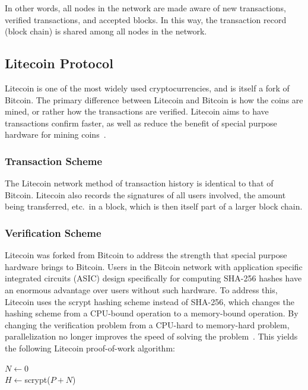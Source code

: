\documentclass[11pt]{article}
\begin{document}
In other words, all nodes in the network are made aware of new transactions,
verified transactions, and accepted blocks. In this way, the transaction record
(block chain) is shared among all nodes in the network.

\subsection{Litecoin Protocol}
Litecoin is one of the most widely used cryptocurrencies, and is itself a fork
of Bitcoin. The primary difference between Litecoin and Bitcoin is how the coins
are mined, or rather how the transactions are verified. Litecoin aims to have
transactions confirm faster, as well as reduce the benefit of special purpose
hardware for mining coins~\cite{survey}.

\subsubsection{Transaction Scheme}
The Litecoin network method of transaction history is identical to that of
Bitcoin. Litecoin also records the signatures of all users involved, the amount
being transferred, etc.\ in a block, which is then itself part of a larger block
chain.

\subsubsection{Verification Scheme}
Litecoin was forked from Bitcoin to address the strength that special purpose
hardware brings to Bitcoin. Users in the Bitcoin network with application
specific integrated circuits (ASIC) design specifically for computing SHA-256
hashes have an enormous advantage over users without such hardware. To address
this, Litecoin uses the scrypt hashing scheme instead of SHA-256, which changes
the hashing scheme from a CPU-bound operation to a memory-bound operation. By
changing the verification problem from a CPU-hard to memory-hard problem,
parallelization no longer improves the speed of solving the
problem~\cite{Percival}. This yields the following Litecoin proof-of-work
algorithm:
\begin{algorithm}
    $N \gets 0$\\
    $H \gets ${\sc scrypt($P + N$)}\\
\end{algorithm}
\end{document}

